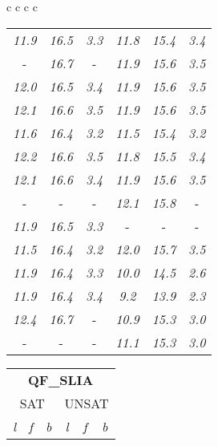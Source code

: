 \documentclass[sigplan,screen]{acmart}
\makeatletter
\newcommand{\ccell}[3][]{%
  \kern-\fboxsep
  \if\relax\detokenize{#1}\relax
    \expandafter\@firstoftwo
  \else
    \expandafter\@secondoftwo
  \fi
  {\colorbox{#2}}%
  {\colorbox[#1]{#2}}%
  {#3}\kern-\fboxsep
}
\makeatother
\begin{document}
\begin{table*}
\begin{tabular}{c c c c}
\begin{tabular}{c c c c c c}
      \textit{11.9} & \textit{16.5} & \textit{3.3} & \textit{11.8} & \textit{15.4} & \textit{3.4} \\
       \ccell[gray]{0.9}{\textit{12.5}} & \textit{16.7} &  \ccell[gray]{0.9}{\textit{3.6}} & \textit{11.9} & \textit{15.6} & \textit{3.5} \\
      \textit{12.0} & \textit{16.5} & \textit{3.4} & \textit{11.9} & \textit{15.6} & \textit{3.5} \\
      \textit{12.1} & \textit{16.6} & \textit{3.5} & \textit{11.9} & \textit{15.6} & \textit{3.5} \\
      \textit{11.6} & \textit{16.4} & \textit{3.2} & \textit{11.5} & \textit{15.4} & \textit{3.2} \\
      \textit{12.2} & \textit{16.6} & \textit{3.5} & \textit{11.8} & \textit{15.5} & \textit{3.4} \\
      \textit{12.1} & \textit{16.6} & \textit{3.4} & \textit{11.9} & \textit{15.6} & \textit{3.5} \\
       \ccell[gray]{0.9}{\textit{12.5}} &  \ccell[gray]{0.9}{\textit{16.8}} &  \ccell[gray]{0.9}{\textit{3.6}} & \textit{12.1} & \textit{15.8} &  \ccell[gray]{0.9}{\textit{3.6}} \\
      \textit{11.9} & \textit{16.5} & \textit{3.3} &  \ccell[gray]{0.9}{\textit{12.3}} &  \ccell[gray]{0.9}{\textit{16.4}} &  \ccell[gray]{0.9}{\textit{3.6}} \\
      \textit{11.5} & \textit{16.4} & \textit{3.2} & \textit{12.0} & \textit{15.7} & \textit{3.5} \\
      \textit{11.9} & \textit{16.4} & \textit{3.3} & \textit{10.0} & \textit{14.5} & \textit{2.6} \\
      \textit{11.9} & \textit{16.4} & \textit{3.4} & \textit{9.2} & \textit{13.9} & \textit{2.3} \\
      \textit{12.4} & \textit{16.7} &  \ccell[gray]{0.9}{\textit{3.6}} & \textit{10.9} & \textit{15.3} & \textit{3.0} \\
       \ccell[gray]{0.9}{\textit{12.5}} &  \ccell[gray]{0.9}{\textit{16.8}} &  \ccell[gray]{0.9}{\textit{3.6}} & \textit{11.1} & \textit{15.3} & \textit{3.0} \\
\end{tabular}
\begin{tabular}{c c c c c c}
  \multicolumn{6}{c}{\textbf{QF\_SLIA}} \\
   \cline{2-5}
  \multicolumn{3}{c}{SAT} & \multicolumn{3}{c}{UNSAT} \\
   \hline
  \textit{l} & \textit{f} & \textit{b} & \textit{l} & \textit{f} & \textit{b} \\

\end{tabular}
\end{tabular}
\end{table*}
\end{document}
